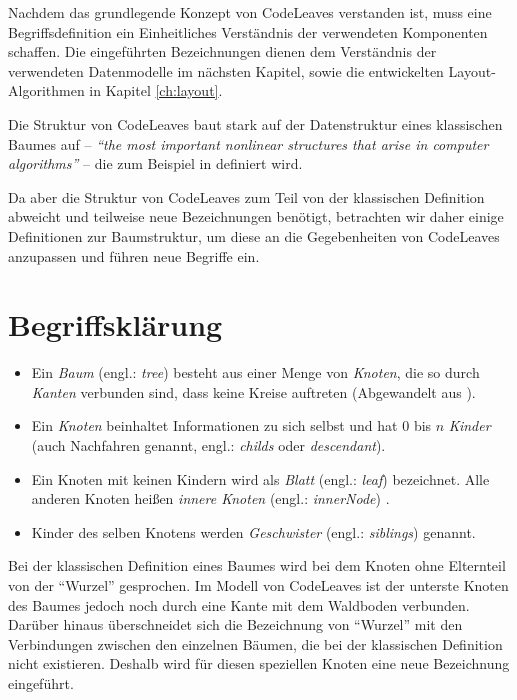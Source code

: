 Nachdem das grundlegende Konzept von CodeLeaves verstanden ist, muss eine Begriffsdefinition ein Einheitliches Verständnis der verwendeten Komponenten schaffen. Die eingeführten Bezeichnungen dienen dem Verständnis der verwendeten Datenmodelle im nächsten Kapitel, sowie die entwickelten Layout-Algorithmen in Kapitel \ref{ch:layout}.

Die Struktur von CodeLeaves baut stark auf der Datenstruktur eines klassischen Baumes auf -- \textit{"`the most important nonlinear structures that arise in computer algorithms"'}\cite{knuth1973fundamental} -- die zum Beispiel in \cite{knuth1973fundamental, ernst2016grundkurs, gumm2009einfuehrung} definiert wird.

Da aber die Struktur von CodeLeaves zum Teil von der klassischen Definition abweicht und teilweise neue Bezeichnungen benötigt, betrachten wir daher einige Definitionen zur Baumstruktur, um diese an die Gegebenheiten von CodeLeaves anzupassen und führen neue Begriffe ein.

\section{Begriffsklärung}
\label{sec:naming}

\begin{itemize}
  \item Ein \textit{Baum} (engl.: \textit{tree}) besteht aus einer Menge von \textit{Knoten}, die so durch \textit{Kanten} verbunden sind, dass keine Kreise auftreten (Abgewandelt aus \cite{gumm2009einfuehrung, ernst2016grundkurs}).
  \item Ein \textit{Knoten} beinhaltet Informationen zu sich selbst und hat $0$ bis $n$ \textit{Kinder} (auch Nachfahren genannt, engl.: \textit{childs} oder \textit{descendant}).
  \item Ein Knoten mit keinen Kindern wird als \textit{Blatt} (engl.: \textit{leaf}) bezeichnet. Alle anderen Knoten heißen \textit{innere Knoten} (engl.: \textit{innerNode}) \cite{gumm2009einfuehrung}.
  \item Kinder des selben Knotens werden \textit{Geschwister} (engl.: \textit{siblings}) genannt.
\end{itemize}

Bei der klassischen Definition eines Baumes wird bei dem Knoten ohne Elternteil von der "`Wurzel"' gesprochen. Im Modell von CodeLeaves ist der unterste Knoten des Baumes jedoch noch durch eine Kante mit dem Waldboden verbunden. Darüber hinaus überschneidet sich die Bezeichnung von "`Wurzel"' mit den Verbindungen zwischen den einzelnen Bäumen, die bei der klassischen Definition nicht existieren. Deshalb wird für diesen speziellen Knoten eine neue Bezeichnung eingeführt.

